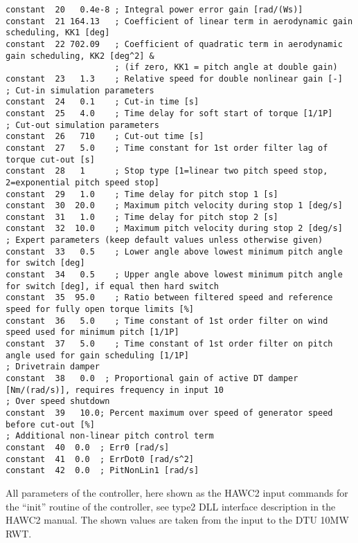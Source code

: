 \begin{table}[t!]
\begin{center}
\begin{verbatim}
constant  20   0.4e-8 ; Integral power error gain [rad/(Ws)]
constant  21 164.13   ; Coefficient of linear term in aerodynamic gain scheduling, KK1 [deg]
constant  22 702.09   ; Coefficient of quadratic term in aerodynamic gain scheduling, KK2 [deg^2] &
                      ; (if zero, KK1 = pitch angle at double gain)
constant  23   1.3    ; Relative speed for double nonlinear gain [-]
; Cut-in simulation parameters
constant  24   0.1    ; Cut-in time [s]
constant  25   4.0    ; Time delay for soft start of torque [1/1P]
; Cut-out simulation parameters
constant  26   710    ; Cut-out time [s]
constant  27   5.0    ; Time constant for 1st order filter lag of torque cut-out [s]
constant  28   1      ; Stop type [1=linear two pitch speed stop, 2=exponential pitch speed stop]
constant  29   1.0    ; Time delay for pitch stop 1 [s]
constant  30  20.0    ; Maximum pitch velocity during stop 1 [deg/s]
constant  31   1.0    ; Time delay for pitch stop 2 [s]
constant  32  10.0    ; Maximum pitch velocity during stop 2 [deg/s]
; Expert parameters (keep default values unless otherwise given)
constant  33   0.5    ; Lower angle above lowest minimum pitch angle for switch [deg]
constant  34   0.5    ; Upper angle above lowest minimum pitch angle for switch [deg], if equal then hard switch
constant  35  95.0    ; Ratio between filtered speed and reference speed for fully open torque limits [%]
constant  36   5.0    ; Time constant of 1st order filter on wind speed used for minimum pitch [1/1P]
constant  37   5.0    ; Time constant of 1st order filter on pitch angle used for gain scheduling [1/1P]
; Drivetrain damper
constant  38   0.0  ; Proportional gain of active DT damper [Nm/(rad/s)], requires frequency in input 10
; Over speed shutdown
constant  39   10.0; Percent maximum over speed of generator speed before cut-out [%]
; Additional non-linear pitch control term
constant  40  0.0  ; Err0 [rad/s] 
constant  41  0.0  ; ErrDot0 [rad/s^2]
constant  42  0.0  ; PitNonLin1 [rad/s]
\end{verbatim}
\caption{All parameters of the controller, here shown as the HAWC2 input commands for the ``init'' routine of the controller, see type2 DLL interface description in the HAWC2 manual. The shown values are taken from the input to the DTU 10MW RWT. \label{t:init}}
\end{center}
\end{table}

